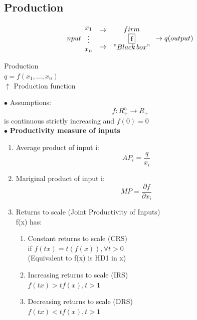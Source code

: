 \documentclass[letterpaper,13pt,single,pdftex]{scrartcl}
\begin{document}
\subsection{Production}
\[nput\begin{array}{*{20}{c}}
{{x_1}}\\
 \vdots \\
{{x_n}}
\end{array}\begin{array}{*{20}{c}}
 \to \\
{}\\
 \to 
\end{array}\begin{array}{*{20}{c}}
{firm}\\
\fbox{f}\\
{"Black \,box"}\\

\end{array} \to q(output)\]
\begin{center}
    {Production}\\
    {$q = f(x_1,\dots,x_n)$}\\
    {     $\uparrow$ Production function}\\
\end{center}
$\bullet$ Assumptions: \[f: R^n_+ \rightarrow R_+\]
is continuous strictly increasing and $f(0) = 0$\\
$\bullet$ \textbf{Productivity measure of inputs}\\
\begin{enumerate}
    \item Average product of input i:
    \[AP_i = \frac{q}{x_i}\]
    \item Mariginal product of input i:
    \[MP = \frac{\partial f}{\partial x_i}\]
    \item Returns to scale (Joint Productivity of Inputs)\\
    f(x) has:
    \begin{enumerate}
        \item  Constant returns to scale (CRS)\\
         if $f(tx) = t(f(x)), \forall t>0$\\
         (Equivalent to f(x) is HD1 in x)
         \item Increasing returns to scale (IRS)\\
         $f(tx) >tf(x), t>1$
         \item Decreasing returns to scale (DRS)\\
         $f(tx)<tf(x), t>1$\\
    \end{enumerate}

\end{enumerate}
\end{document}
